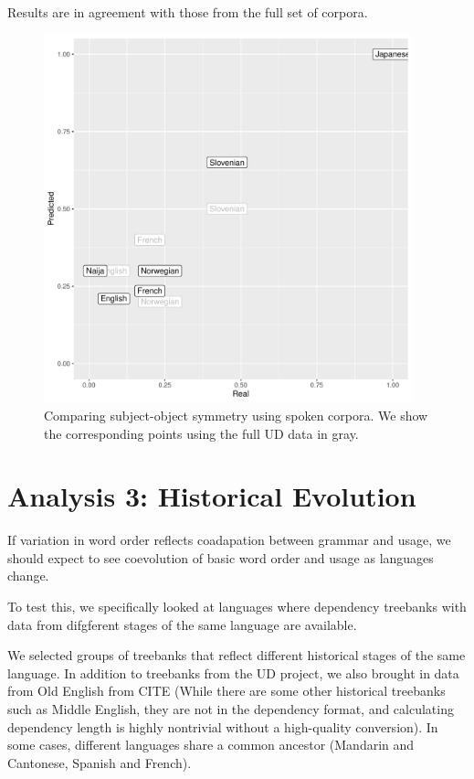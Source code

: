 \documentclass[11pt,a4paper]{article}
\begin{document}
Results are in agreement with those from the full set of corpora.


\begin{figure}
    \centering
    \includegraphics[width=0.95\textwidth]{analysis_spoken/spoken.pdf}
    \caption{Comparing subject-object symmetry using spoken corpora. We show the corresponding points using the full UD data in gray.}
    \label{fig:spoken}
\end{figure}



\section{Analysis 3: Historical Evolution}


If variation in word order reflects coadapation between grammar and usage, we should expect to see coevolution of basic word order and usage as languages change.

To test this, we specifically looked at languages where dependency treebanks with data from difgferent stages of the same language are available.

We selected groups of treebanks that reflect different historical stages of the same language.
In addition to treebanks from the UD project, we also brought in data from Old English from CITE (While there are some other historical treebanks such as Middle English, they are not in the dependency format, and calculating dependency length is highly nontrivial without a high-quality conversion).
In some cases, different languages share a common ancestor (Mandarin and Cantonese, Spanish and French).
\end{document}
